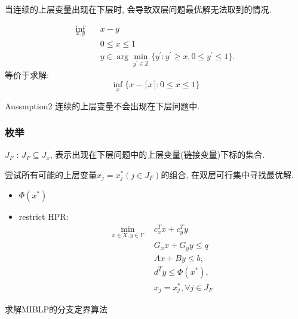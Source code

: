 \documentclass[10pt]{beamer}
\begin{document}
\begin{frame}
	当连续的上层变量出现在下层时, 会导致双层问题最优解无法取到的情况. 
	\begin{tcolorbox}
		\begin{equation*}
			\begin{aligned}
				\inf_{x,y}&\quad x-y\\
				&\quad0\leq x\leq1\\
				&\quad y\in\arg\min_{y^{\prime}\in\mathbb{Z}}\{y^{\prime}:y^{\prime}\geq x,0\leq y^{\prime}\leq1\}.
			\end{aligned}
		\end{equation*}
		等价于求解:
		\begin{equation*}
			\inf_x\{x-\lceil x\rceil:0\leq x\leq1\}
		\end{equation*}
	\end{tcolorbox}

	\begin{block}{Aussmption2}
		连续的上层变量不会出现在下层问题中.
	\end{block}
\end{frame}

\begin{frame}
	\frametitle{枚举}
	\begin{definition}
		$J_F$ : $J_F\subseteq  J_x$, 表示出现在下层问题中的上层变量(链接变量)下标的集合.
	\end{definition}
	尝试所有可能的上层变量$x_j=x_j^*(j\in J_F)$的组合, 在双层可行集中寻找最优解.
	\begin{itemize}
		\item $\Phi(x^*)$
		\item restrict HPR:
		\begin{subequations}
			\begin{align}
				\min_{x\in X,y\in Y}~~&c_{x}^{T}x+c_{y}^{T}y \\
				&G_xx+G_yy \leq q  \\
				&Ax+By\leq b,\\
				&d^{T}y\leq \Phi(x^*), \\
				&x_j=x_j^*, \forall j\in J_F
			\end{align}
		\end{subequations}
	\end{itemize}
	
\end{frame}

\begin{frame}
	\begin{algorithm}[H]
		\caption{求解MIBLP的分支定界算法}
	\end{algorithm}
\end{frame}
\end{document}
